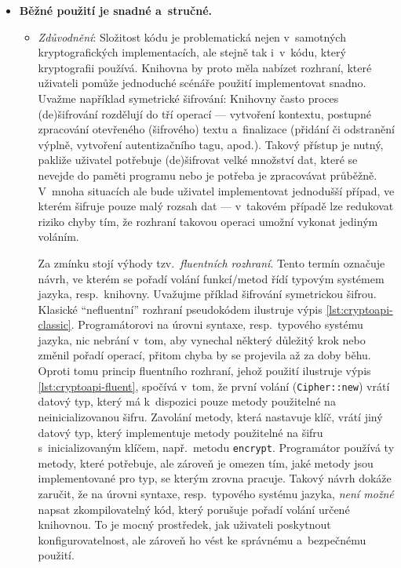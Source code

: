 \begin{itemize}
    \item \textbf{Běžné použití je snadné a~stručné.} 
    \begin{itemize}[beginpenalty=10000]
        \item \textit{Zdůvodnění}: Složitost kódu je problematická nejen v~samotných kryptografických implementacích, ale stejně tak i~v~kódu, který kryptografii používá. Knihovna by proto měla nabízet rozhraní, které uživateli pomůže jednoduché scénáře použití implementovat snadno. Uvažme například symetrické šifrování: Knihovny často proces (de)šifrování rozdělují do tří operací --- vytvoření kontextu, postupné zpracování otevřeného (šifrového) textu a~finalizace (přidání či odstranění výplně, vytvoření autentizačního tagu, apod.). Takový přístup je nutný, pakliže uživatel potřebuje (de)šifrovat velké množství dat, které se nevejde do paměti programu nebo je potřeba je zpracovávat průběžně. V~mnoha situacích ale bude uživatel implementovat jednodušší případ, ve kterém šifruje pouze malý rozsah dat --- v~takovém případě lze redukovat riziko chyby tím, že rozhraní takovou operaci umožní vykonat jediným voláním.

        Za zmínku stojí výhody tzv.~\textit{fluentních rozhraní}. Tento termín označuje návrh, ve kterém se pořadí volání funkcí/metod řídí typovým systémem jazyka, resp.\ knihovny. Uvažujme příklad šifrování symetrickou šifrou. Klasické ``nefluentní'' rozhraní pseudokódem ilustruje výpis \ref{lst:cryptoapi-classic}. Programátorovi na úrovni syntaxe, resp.\ typového systému jazyka, nic nebrání v~tom, aby vynechal některý důležitý krok nebo změnil pořadí operací, přitom chyba by se projevila až za doby běhu. Oproti tomu princip fluentního rozhraní, jehož použití ilustruje výpis \ref{lst:cryptoapi-fluent}, spočívá v~tom, že první volání (\texttt{Cipher::new}) vrátí datový typ, který má k~dispozici pouze metody použitelné na neinicializovanou šifru. Zavolání metody, která nastavuje klíč, vrátí jiný datový typ, který implementuje metody použitelné na šifru s~inicializovaným klíčem, např.\ metodu \texttt{encrypt}. Programátor používá ty metody, které potřebuje, ale zároveň je omezen tím, jaké metody jsou implementované pro typ, se kterým zrovna pracuje. Takový návrh dokáže zaručit, že na úrovni syntaxe, resp.\ typového systému jazyka, \emph{není možné} napsat zkompilovatelný kód, který porušuje pořadí volání určené knihovnou. To je mocný prostředek, jak uživateli poskytnout konfigurovatelnost, ale zároveň ho vést ke správnému a~bezpečnému použití.


\end{itemize}
\end{itemize}
